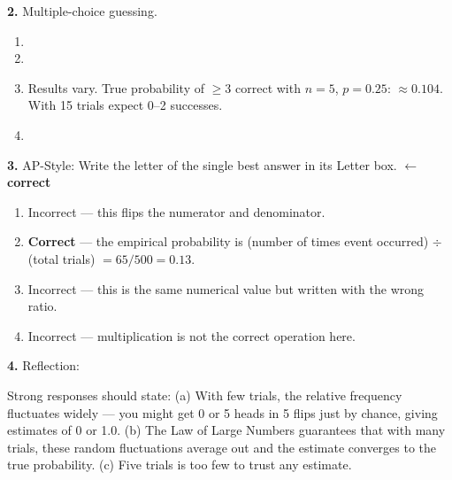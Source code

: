 \documentclass[10pt]{article}
\begin{document}
\begin{practicebox}
\vspace{6pt}
\textbf{2.} Multiple-choice guessing.
\begin{enumerate}[label=(\alph*), leftmargin=2em, itemsep=5pt]
  \item {}\gradedkey{\smash{\raisebox{-3.6pt}{\gradedblank[id=hw2a, type=short, points=1, answer=0.25, check=numeric, tolerance=0]{1.8cm}{0.2in}}}}
  \item {}
  \item \begin{teachernote}Results vary. True probability of $\geq 3$ correct with $n=5$, $p=0.25$: $\approx 0.104$. With 15 trials expect 0--2 successes.\end{teachernote}
\tcbbreak
  \item {}
\end{enumerate}

\vspace{6pt}
\textbf{3.} AP-Style: Write the letter of the single best answer in its Letter box.  \textcolor{keyred}{\textbf{$\leftarrow$ correct}}
\begin{enumerate}[label=(\Alph*), leftmargin=2em, itemsep=2pt]
  \item Incorrect --- this flips the numerator and denominator.
  \item \textbf{Correct} --- the empirical probability is (number of times event occurred) $\div$ (total trials) $= 65/500 = 0.13$.
  \item Incorrect --- this is the same numerical value but written with the wrong ratio.
  \item Incorrect --- multiplication is not the correct operation here.
\end{enumerate}

\vspace{6pt}
\textbf{4.} Reflection:
\begin{teachernote}
Strong responses should state: (a) With few trials, the relative frequency fluctuates widely --- you might get 0 or 5 heads in 5 flips just by chance, giving estimates of 0 or 1.0. (b) The Law of Large Numbers guarantees that with many trials, these random fluctuations average out and the estimate converges to the true probability. (c) Five trials is too few to trust any estimate.
\end{teachernote}


\end{practicebox}
\end{document}
